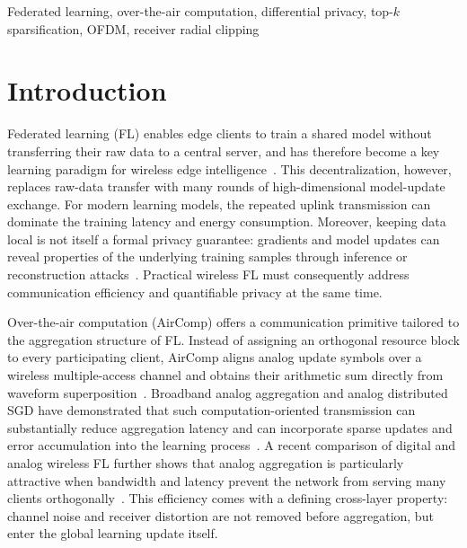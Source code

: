 \documentclass[journal]{IEEEtran}
\begin{document}
\begin{IEEEkeywords}
Federated learning, over-the-air computation, differential privacy, top-$k$ sparsification, OFDM, receiver radial clipping
\end{IEEEkeywords}


\section{Introduction}
\label{sec:introduction}
Federated learning (FL) enables edge clients to train a shared model without transferring their raw data to a central server, and has therefore become a key learning paradigm for wireless edge intelligence~\cite{mcmahan2017communication,cao2023overview}. This decentralization, however, replaces raw-data transfer with many rounds of high-dimensional model-update exchange. For modern learning models, the repeated uplink transmission can dominate the training latency and energy consumption. Moreover, keeping data local is not itself a formal privacy guarantee: gradients and model updates can reveal properties of the underlying training samples through inference or reconstruction attacks~\cite{zhu2019deep,wei2020federated}. Practical wireless FL must consequently address communication efficiency and quantifiable privacy at the same time.

Over-the-air computation (AirComp) offers a communication primitive tailored to the aggregation structure of FL. Instead of assigning an orthogonal resource block to every participating client, AirComp aligns analog update symbols over a wireless multiple-access channel and obtains their arithmetic sum directly from waveform superposition~\cite{zhu2019broadband,yang2020federated}. Broadband analog aggregation and analog distributed SGD have demonstrated that such computation-oriented transmission can substantially reduce aggregation latency and can incorporate sparse updates and error accumulation into the learning process~\cite{amiri2020machine}. A recent comparison of digital and analog wireless FL further shows that analog aggregation is particularly attractive when bandwidth and latency prevent the network from serving many clients orthogonally~\cite{yao2024wireless}. This efficiency comes with a defining cross-layer property: channel noise and receiver distortion are not removed before aggregation, but enter the global learning update itself.
\end{document}
